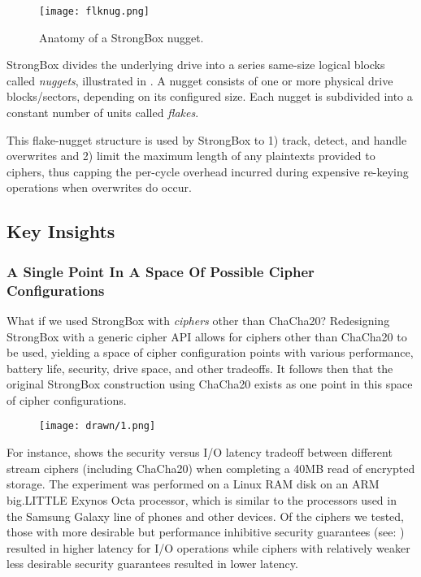 \begin{figure}[ht]
   \centering
   \texttt{[image: flknug.png]}
   \caption{Anatomy of a StrongBox nugget.}\label{fig:flknug}
\end{figure}

StrongBox divides the underlying drive into a series same-size logical blocks
called \emph{nuggets}, illustrated in . A nugget consists of one
or more physical drive blocks/sectors, depending on its configured size. Each
nugget is subdivided into a constant number of units called \emph{flakes}.

This flake-nugget structure is used by StrongBox to 1) track, detect, and handle
overwrites and 2) limit the maximum length of any plaintexts provided to
ciphers, thus capping the per-cycle overhead incurred during expensive re-keying
operations when overwrites do occur.

\subsection{Key Insights}

\subsubsection{A Single Point In A Space Of Possible Cipher Configurations}

What if we used StrongBox with \textit{ciphers} other than ChaCha20? Redesigning
StrongBox with a generic cipher API allows for ciphers other than ChaCha20 to be
used, yielding a space of cipher configuration points with various performance,
battery life, security, drive space, and other tradeoffs. It follows then that
the original StrongBox construction using ChaCha20 exists as one point in this
space of cipher configurations.

\begin{figure}[ht]
   \centering
   \texttt{[image: drawn/1.png]}
   \caption{}\label{fig:40mb-read}
\end{figure}

For instance,  shows the security versus I/O latency tradeoff
between different stream ciphers (including ChaCha20) when completing a 40MB
read of encrypted storage. The experiment was performed on a Linux RAM disk on
an ARM big.LITTLE Exynos Octa processor, which is similar to the processors used
in the Samsung Galaxy line of phones and other devices. Of the ciphers we
tested, those with more desirable but performance inhibitive security guarantees
(see: ) resulted in higher latency for I/O operations while
ciphers with relatively weaker less desirable security guarantees resulted in
lower latency.

